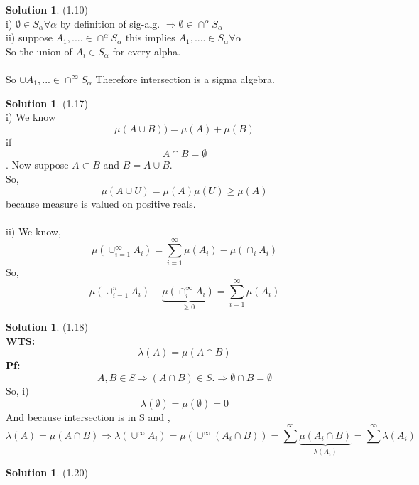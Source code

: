 \documentclass[letterpaper,12pt]{article}
\theoremstyle{definition}
\newtheorem{solution}[theorem]{Solution}
\begin{document}
\begin{solution} (1.10) \\
i) $\emptyset \in S_\alpha \forall \alpha$ by definition of sig-alg. $\Rightarrow \emptyset \in \cap^\alpha S_\alpha$ \\
ii) suppose $A_1,.... \in \cap^\alpha S_\alpha$ this implies $A_1,.... \in S_\alpha \forall \alpha$ \\
So the union of $A_i \in S_\alpha$ for every alpha. \\~\\
So $\cup A_1,... \in \cap^\infty S_\alpha$ Therefore intersection is a sigma algebra.
\end{solution}

\begin{solution} (1.17) \\
i) We know \[ \mu(A\cup B)) = \mu(A) + \mu(B)\] if \[A\cap B = \emptyset\].
Now suppose $A \subset B$ and
$B = A \cup B$. \\
So, \[\mu(A \cup U) = \mu(A) \mu(U) \ge \mu(A)\] because measure is valued on positive reals.
\\~\\

ii) We know, \[
\mu (\cup_{i=1}^\infty A_i) = \sum_{i=1}^\infty \mu(A_i) - \mu(\cap_i A_i)
\]
So, \[
\mu(\cup_{i=1}^n A_i) + \underbrace{\mu(\cap_i^\infty A_i)}_{\ge 0} = \sum_{i=1}^\infty \mu(A_i)
\]
\end{solution}

\begin{solution} (1.18) \\
\textbf{WTS:}\[
\lambda(A) = \mu(A\cap B)
\]
\textbf{Pf:}\[ A,B \in S \Rightarrow (A \cap B) \in S. \Rightarrow \emptyset \cap B
= \emptyset
\]
So, i) \[ \lambda(\emptyset) = \mu(\emptyset) = 0
\]
And because intersection is in S and , \[\lambda(A) = \mu(A\cap B) \Rightarrow
\lambda(\cup^\infty A_i) = \mu(\cup^\infty (A_i \cap B)) = \sum^\infty \underbrace{\mu(A_i \cap B)}_{\lambda(A_i)}
= \sum^\infty \lambda(A_i)
\]
\end{solution}


\begin{solution} (1.20)
\end{solution}
\end{document}
